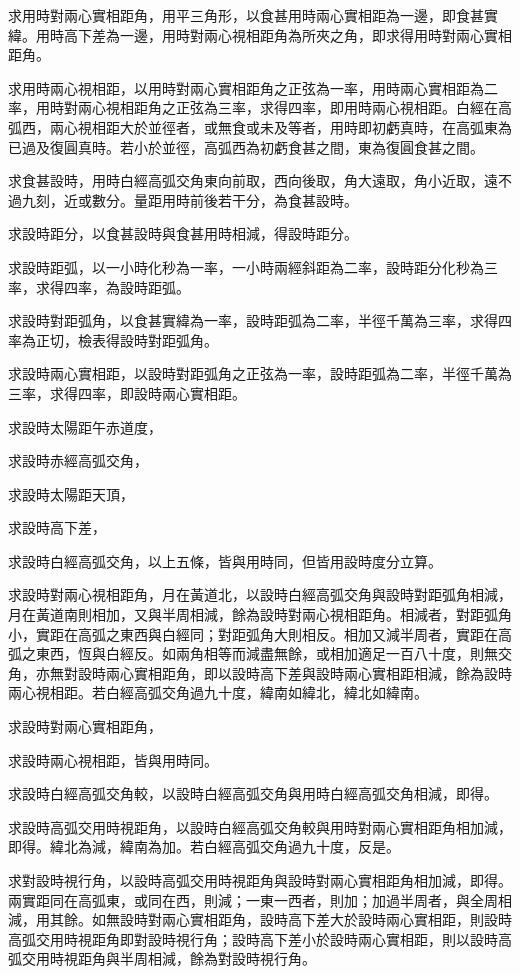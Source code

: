 \begin{pinyinscope}
求用時對兩心實相距角，用平三角形，以食甚用時兩心實相距為一邊，即食甚實緯。用時高下差為一邊，用時對兩心視相距角為所夾之角，即求得用時對兩心實相距角。

求用時兩心視相距，以用時對兩心實相距角之正弦為一率，用時兩心實相距為二率，用時對兩心視相距角之正弦為三率，求得四率，即用時兩心視相距。白經在高弧西，兩心視相距大於並徑者，或無食或未及等者，用時即初虧真時，在高弧東為已過及復圓真時。若小於並徑，高弧西為初虧食甚之間，東為復圓食甚之間。

求食甚設時，用時白經高弧交角東向前取，西向後取，角大遠取，角小近取，遠不過九刻，近或數分。量距用時前後若干分，為食甚設時。

求設時距分，以食甚設時與食甚用時相減，得設時距分。

求設時距弧，以一小時化秒為一率，一小時兩經斜距為二率，設時距分化秒為三率，求得四率，為設時距弧。

求設時對距弧角，以食甚實緯為一率，設時距弧為二率，半徑千萬為三率，求得四率為正切，檢表得設時對距弧角。

求設時兩心實相距，以設時對距弧角之正弦為一率，設時距弧為二率，半徑千萬為三率，求得四率，即設時兩心實相距。

求設時太陽距午赤道度，

求設時赤經高弧交角，

求設時太陽距天頂，

求設時高下差，

求設時白經高弧交角，以上五條，皆與用時同，但皆用設時度分立算。

求設時對兩心視相距角，月在黃道北，以設時白經高弧交角與設時對距弧角相減，月在黃道南則相加，又與半周相減，餘為設時對兩心視相距角。相減者，對距弧角小，實距在高弧之東西與白經同；對距弧角大則相反。相加又減半周者，實距在高弧之東西，恆與白經反。如兩角相等而減盡無餘，或相加適足一百八十度，則無交角，亦無對設時兩心實相距角，即以設時高下差與設時兩心實相距相減，餘為設時兩心視相距。若白經高弧交角過九十度，緯南如緯北，緯北如緯南。

求設時對兩心實相距角，

求設時兩心視相距，皆與用時同。

求設時白經高弧交角較，以設時白經高弧交角與用時白經高弧交角相減，即得。

求設時高弧交用時視距角，以設時白經高弧交角較與用時對兩心實相距角相加減，即得。緯北為減，緯南為加。若白經高弧交角過九十度，反是。

求對設時視行角，以設時高弧交用時視距角與設時對兩心實相距角相加減，即得。兩實距同在高弧東，或同在西，則減；一東一西者，則加；加過半周者，與全周相減，用其餘。如無設時對兩心實相距角，設時高下差大於設時兩心實相距，則設時高弧交用時視距角即對設時視行角；設時高下差小於設時兩心實相距，則以設時高弧交用時視距角與半周相減，餘為對設時視行角。


\end{pinyinscope}
